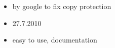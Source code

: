 \begin{itemize}
    \item by google to fix copy protection
    \item 27.7.2010
    \item easy to use, documentation
\end{itemize}

